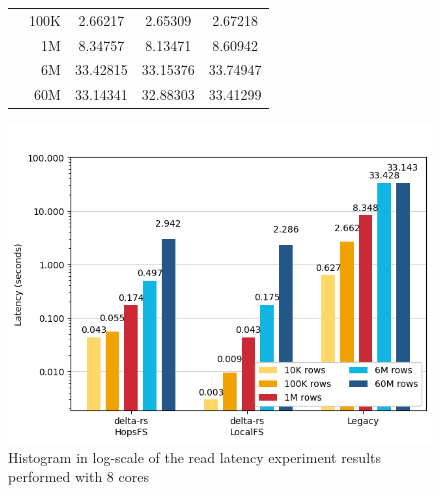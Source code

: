 \begin{figure}
\begin{minipage}[b]{\textwidth}
\begin{tabular}{c r S[table-format=5.5] S[table-format=5.5] S[table-format=5.5]}
                                      & 100K &     2.66217 &    2.65309 &    2.67218\\ 
                                      & 1M   &     8.34757 &    8.13471 &    8.60942\\
                                      & 6M   &    33.42815 &   33.15376 &   33.74947\\
                                      & 60M  &    33.14341 &   32.88303 &   33.41299\\
            \bottomrule
        \end{tabular}
    \end{minipage}
    \begin{minipage}[b]{\textwidth}
        \centering
        \includegraphics[width=\textwidth]{figures/99-appendix/results-diagrams/read/read_time_8_core.png}
        \caption{Histogram in log-scale of the read latency experiment results performed with 8  cores}
        \label{fig:appx_res_read_time_8_cores}
    \end{minipage}
\end{figure}


